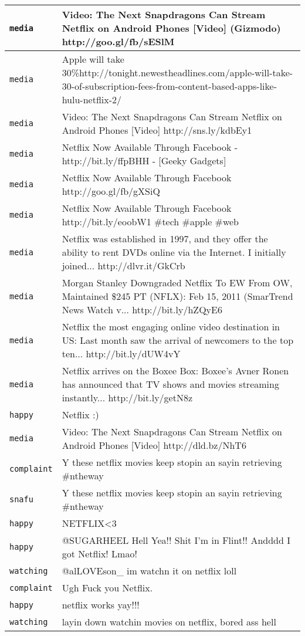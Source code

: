 {\begin{longtable}{|l|p{160mm}|}
         \texttt{media} & Video: The Next Snapdragons Can Stream Netflix on Android Phones [Video] (Gizmodo) http://goo.gl/fb/sESlM
      \tabularnewline\hline
         \texttt{media} & Apple will take 30\%http://tonight.newestheadlines.com/apple-will-take-30-of-subscription-fees-from-content-based-apps-like-hulu-netflix-2/
      \tabularnewline\hline
         \texttt{media} & Video: The Next Snapdragons Can Stream Netflix on Android Phones [Video] http://sns.ly/kdbEy1
      \tabularnewline\hline
         \texttt{media} & Netflix Now Available Through Facebook - http://bit.ly/ffpBHH - [Geeky Gadgets]
      \tabularnewline\hline
         \texttt{media} & Netflix Now Available Through Facebook http://goo.gl/fb/gXSiQ
      \tabularnewline\hline
         \texttt{media} & Netflix Now Available Through Facebook http://bit.ly/eoobW1 \#tech \#apple \#web
      \tabularnewline\hline
         \texttt{media} & Netflix was established in 1997, and they offer the ability to rent DVDs online via the Internet. I initially joined... http://dlvr.it/GkCrb
      \tabularnewline\hline
         \texttt{media} & Morgan Stanley Downgraded Netflix To EW From OW, Maintained \$245 PT (NFLX): Feb 15, 2011 (SmarTrend News Watch v... http://bit.ly/hZQyE6
      \tabularnewline\hline
         \texttt{media} & Netflix the most engaging online video destination in US: Last month saw the arrival of newcomers to the top ten... http://bit.ly/dUW4vY
      \tabularnewline\hline
         \texttt{media} & Netflix arrives on the Boxee Box: Boxee's Avner Ronen has announced that TV shows and movies streaming instantly... http://bit.ly/getN8z
      \tabularnewline\hline
         \texttt{happy} & Netflix :)
      \tabularnewline\hline
         \texttt{media} & Video: The Next Snapdragons Can Stream Netflix on Android Phones [Video] http://dld.bz/NhT6
      \tabularnewline\hline
         \texttt{complaint} & Y these netflix movies keep stopin an sayin retrieving \#ntheway
      \tabularnewline\hline
         \texttt{snafu} & Y these netflix movies keep stopin an sayin retrieving \#ntheway
      \tabularnewline\hline
         \texttt{happy} & NETFLIX<3
      \tabularnewline\hline
         \texttt{happy} & @SUGARHEEL Hell Yea!! Shit I'm in Flint!! Andddd I got Netflix! Lmao!
      \tabularnewline\hline
         \texttt{watching} & @alLOVEson\_ im watchn it on netflix loll
      \tabularnewline\hline
         \texttt{complaint} & Ugh Fuck you Netflix.
      \tabularnewline\hline
         \texttt{happy} & netflix works yay!!!
      \tabularnewline\hline
         \texttt{watching} & layin down watchin movies on netflix, bored ass hell

\end{longtable}}
